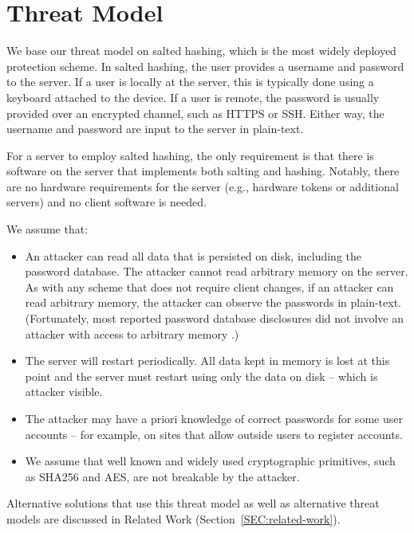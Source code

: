 \section{Threat Model}
\label{SEC:threat-model}

We base our threat model on salted hashing, which is the most widely deployed
protection scheme.  In salted hashing, the user provides a username and
password to the server.  If a user is locally at the server, this is typically
done using a keyboard attached to the device.  If a user is remote, the
password is usually provided over an encrypted channel, such as HTTPS or SSH.
Either way, the username and password are input to the server in plain-text.   

For a server to employ salted hashing, the only requirement is that there is
software on the server that implements both salting and hashing.  Notably,
there are no hardware requirements for the server (e.g., hardware tokens or
additional servers) and no client software is needed.  
    
We assume that:

\begin{itemize}

    \item An attacker can read all data that is persisted on disk, including
    the password database.  The attacker cannot read arbitrary memory on the
    server.  As with any scheme that does not require client changes, if an
    attacker can read arbitrary memory, the attacker can observe the passwords
    in plain-text. (Fortunately, most reported password database disclosures
    did not involve an attacker with access to arbitrary memory
    \cite{miranteTR13, passwordresearchblog}.)

    \item The server will restart periodically. All data kept in memory is lost
    at this point and the server must restart using only the data on disk -- which
    is attacker visible. 

    \item The attacker may have a priori knowledge of correct passwords for
    some user accounts -- for example, on sites that allow outside users to register
    accounts.

    \item We assume that well known and widely used cryptographic primitives, such as
    SHA256 and AES, are not breakable by the attacker.

\end{itemize}

Alternative solutions that use this threat model as well as alternative threat models are 
discussed in Related Work (Section~\ref{SEC:related-work}).

